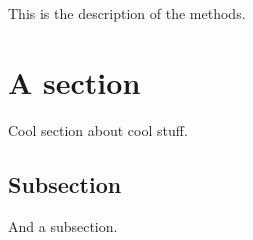 This is the description of the methods. 
\section{A section}\label{seq}
Cool section about cool stuff.

\subsection*{Subsection}
And a subsection.


